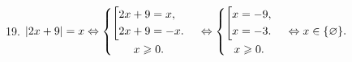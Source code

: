 19. $|2x+9|=x\Leftrightarrow \begin{cases}
  \begin{gathered}
    \left[
      \begin{gathered}
        2x+9=x, \hfill
        \\
        2x+9=-x. \hfill
        \\
      \end{gathered}
    \right. \hfill
    \\
    x\geqslant 0.    \\
  \end{gathered}
\end{cases}\Leftrightarrow \begin{cases}
  \begin{gathered}
    \left[
      \begin{gathered}
        x=-9, \hfill
        \\
        x=-3. \hfill
        \\
      \end{gathered}
    \right. \hfill
    \\
    x\geqslant 0.    \\
  \end{gathered}
\end{cases}
\Leftrightarrow x \in \{\varnothing\}.$\\
